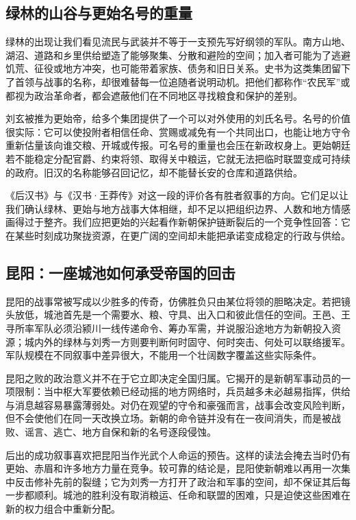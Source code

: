 \subsection{绿林的山谷与更始名号的重量}

绿林的出现让我们看见流民与武装并不等于一支预先写好纲领的军队。南方山地、湖沼、道路和乡里供给塑造了能够聚集、分散和避险的空间；加入者可能为了逃避饥荒、征役或地方冲突，也可能带着家族、债务和旧日关系。史书为这类集团留下了首领与战事的名称，却很难替每一位追随者说明动机。把他们都称作“农民军”或都视为政治革命者，都会遮蔽他们在不同地区寻找粮食和保护的差别。

刘玄被推为更始帝，给多个集团提供了一个可以对外使用的刘氏名号。名号的价值很实际：它可以使投附者相信任命、赏赐或减免有一个共同出口，也能让地方守令重新估量该向谁交粮、开城或传报。可名号的重量也会压在新政权身上。更始朝廷若不能稳定分配官爵、约束将领、取得关中粮运，它就无法把临时联盟变成可持续的政府。旧汉的名称能够召回记忆，却不能替长安的仓库和道路供给。

《后汉书》与《汉书·王莽传》对这一段的评价各有胜者叙事的方向。它们足以让我们确认绿林、更始与地方战事大体相继，却不足以把组织边界、人数和地方情感画得过于整齐。我们应把更始的兴起看作新朝保护链断裂后的一个竞争性回答：它在某些时刻成功聚拢资源，在更广阔的空间却未能把承诺变成稳定的行政与供给。

\subsection{昆阳：一座城池如何承受帝国的回击}

昆阳的战事常被写成以少胜多的传奇，仿佛胜负只由某位将领的胆略决定。若把镜头放低，城池首先是一个需要水、粮、守具、出入口和彼此信任的空间。王邑、王寻所率军队必须沿颍川一线传递命令、筹办军需，并说服沿途地方为新朝投入资源；城内外的绿林与刘秀一方则要判断何时固守、何时突击、何处可以联络援军。军队规模在不同叙事中差异很大，不能用一个壮阔数字覆盖这些实际条件。

昆阳之败的政治意义并不在于它立即决定全国归属。它揭开的是新朝军事动员的一项限制：当中枢大军要依赖已经动摇的地方网络时，兵员越多未必越易指挥，供给与消息越容易暴露薄弱处。对仍在观望的守令和豪强而言，战事会改变风险判断，但不会使他们在同一天改换立场。新朝的命令链并没有在一夜间消失，而是被战败、谣言、逃亡、地方自保和新的名号逐段侵蚀。

后出的成功叙事喜欢把昆阳当作光武个人命运的预告。这样的读法会掩去当时仍有更始、赤眉和许多地方力量在竞争。较可靠的结论是，昆阳使新朝难以再用一次集中反击修补先前的裂缝；它为刘秀一方打开了政治和军事的空间，却不保证其后每一步都顺利。城池的胜利没有取消粮运、任命和联盟的困难，只是迫使这些困难在新的权力组合中重新分配。

